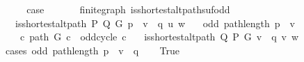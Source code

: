 \begin{isabellebody}
\ \ \isamarkupfalse%
\ \isamarkupfalse%
\ {\isacharquery}{\kern0pt}case\isanewline
\ \ \ \ \isacommand{{\isachardot}{\kern0pt}{\isachardot}{\kern0pt}}\isamarkupfalse%
\isanewline
{}\isamarkupfalse%
%
\endisatagproof
{\isafoldproof}%
%
\isadelimproof
\isanewline
%
\endisadelimproof
%
\isadeliminvisible
\isanewline
%
\endisadeliminvisible
%
\isataginvisible
{}\isamarkupfalse%
\ {\isacharparenleft}{\kern0pt}\ finite{\isacharunderscore}{\kern0pt}graph{\isacharparenright}{\kern0pt}\ is{\isacharunderscore}{\kern0pt}shortest{\isacharunderscore}{\kern0pt}alt{\isacharunderscore}{\kern0pt}path{\isacharunderscore}{\kern0pt}suf{\isacharunderscore}{\kern0pt}odd{\isacharcolon}{\kern0pt}\isanewline
\ \ \ {\isachardoublequoteopen}is{\isacharunderscore}{\kern0pt}shortest{\isacharunderscore}{\kern0pt}alt{\isacharunderscore}{\kern0pt}path\ P\ Q\ G\ {\isacharparenleft}{\kern0pt}p\ {\isacharat}{\kern0pt}\ v\ {\isacharhash}{\kern0pt}\ q{\isacharparenright}{\kern0pt}\ u\ w{\isachardoublequoteclose}\isanewline
\ \ \ {\isachardoublequoteopen}odd\ {\isacharparenleft}{\kern0pt}path{\isacharunderscore}{\kern0pt}length\ {\isacharparenleft}{\kern0pt}p\ {\isacharat}{\kern0pt}\ {\isacharbrackleft}{\kern0pt}v{\isacharbrackright}{\kern0pt}{\isacharparenright}{\kern0pt}{\isacharparenright}{\kern0pt}{\isachardoublequoteclose}\isanewline
\ \ \ {\isachardoublequoteopen}{\isasymnot}\ {\isacharparenleft}{\kern0pt}{\isasymexists}c{\isachardot}{\kern0pt}\ path\ G\ c\ {\isasymand}\ odd{\isacharunderscore}{\kern0pt}cycle\ c{\isacharparenright}{\kern0pt}{\isachardoublequoteclose}\isanewline
\ \ \ {\isachardoublequoteopen}is{\isacharunderscore}{\kern0pt}shortest{\isacharunderscore}{\kern0pt}alt{\isacharunderscore}{\kern0pt}path\ Q\ P\ G\ {\isacharparenleft}{\kern0pt}v\ {\isacharhash}{\kern0pt}\ q{\isacharparenright}{\kern0pt}\ v\ w{\isachardoublequoteclose}%
\endisataginvisible
{\isafoldinvisible}%
%
\isadeliminvisible
\isanewline
%
\endisadeliminvisible
%
\isadelimproof
%
\endisadelimproof
%
\isatagproof
{}\isamarkupfalse%
\ {\isacharparenleft}{\kern0pt}cases\ {\isachardoublequoteopen}odd\ {\isacharparenleft}{\kern0pt}path{\isacharunderscore}{\kern0pt}length\ {\isacharparenleft}{\kern0pt}p\ {\isacharat}{\kern0pt}\ v\ {\isacharhash}{\kern0pt}\ q{\isacharparenright}{\kern0pt}{\isacharparenright}{\kern0pt}{\isachardoublequoteclose}{\isacharparenright}{\kern0pt}\isanewline
\ \ \isamarkupfalse%
\ True\isanewline
\ \ \isamarkupfalse%

\end{isabellebody}

